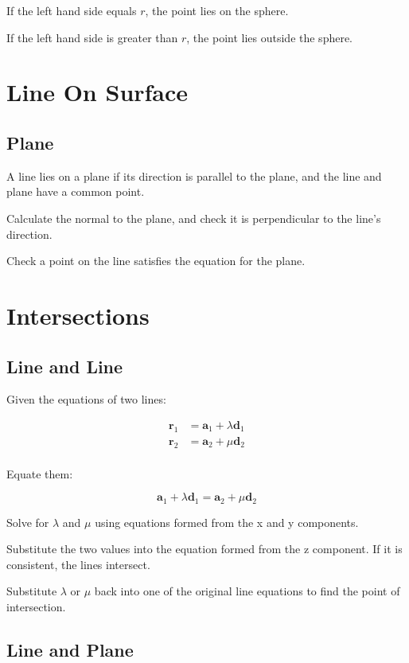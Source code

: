 \documentclass[a4paper,11pt]{article}
\newcommand{\bb}{\boldsymbol}
\begin{document}
If the left hand side equals $r$, the point lies on the sphere.

If the left hand side is greater than $r$, the point lies outside the sphere.




\section{Line On Surface}

\subsection{Plane}

A line lies on a plane if its direction is parallel to the plane, and the line
and plane have a common point.

Calculate the normal to the plane, and check it is perpendicular to the line's
direction.

Check a point on the line satisfies the equation for the plane.




\section{Intersections}

\subsection{Line and Line}

Given the equations of two lines:

$$
\begin{aligned}
\bb{r}_1 & = \bb{a}_1 + \lambda \bb{d}_1 \\
\bb{r}_2 & = \bb{a}_2 + \mu \bb{d}_2 \\
\end{aligned}
$$

Equate them:

$$
\bb{a}_1 + \lambda \bb{d}_1 = \bb{a}_2 + \mu \bb{d}_2
$$

Solve for $\lambda$ and $\mu$ using equations formed from the x and y
components.

Substitute the two values into the equation formed from the z component. If it
is consistent, the lines intersect.

Substitute $\lambda$ or $\mu$ back into one of the original line equations to
find the point of intersection.


\subsection{Line and Plane}
\end{document}
